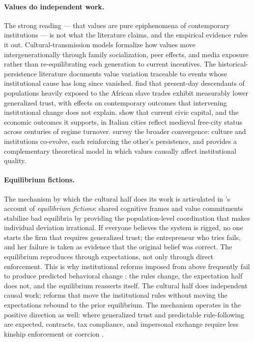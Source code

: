 \documentclass{article}
\theoremstyle{plain}
\theoremstyle{definition}
\theoremstyle{remark}
\begin{document}
\paragraph{Values do independent work.} The strong reading --- that values are pure epiphenomena of contemporary institutions --- is not what the literature claims, and the empirical evidence rules it out. Cultural-transmission models \citep{bisin2001economics} formalize how values move intergenerationally through family socialization, peer effects, and media exposure rather than re-equilibrating each generation to current incentives. The historical-persistence literature documents value variation traceable to events whose institutional cause has long since vanished. \citet{nunnwantchekon2011} find that present-day descendants of populations heavily exposed to the African slave trades exhibit measurably lower generalized trust, with effects on contemporary outcomes that intervening institutional change does not explain. \citet{guiso2016long} show that current civic capital, and the economic outcomes it supports, in Italian cities reflect medieval free-city status across centuries of regime turnover. \citet{alesina2015culture} survey the broader convergence: culture and institutions co-evolve, each reinforcing the other's persistence, and \citet{tabellini2008institutions} provides a complementary theoretical model in which values causally affect institutional quality.

\paragraph{Equilibrium fictions.} The mechanism by which the cultural half does its work is articulated in \citet{hoffstiglitz2010, hoffstiglitz2016striving}'s account of \emph{equilibrium fictions}: shared cognitive frames and value commitments stabilize bad equilibria by providing the population-level coordination that makes individual deviation irrational. If everyone believes the system is rigged, no one starts the firm that requires generalized trust; the entrepreneur who tries fails, and her failure is taken as evidence that the original belief was correct. The equilibrium reproduces through expectations, not only through direct enforcement. This is why institutional reforms imposed from above frequently fail to produce predicted behavioral change \citep{greif2006institutions}: the rules change, the expectation half does not, and the equilibrium reasserts itself. The cultural half does independent causal work; reforms that move the institutional rules without moving the expectations rebound to the prior equilibrium. The mechanism operates in the positive direction as well: where generalized trust and predictable rule-following are expected, contracts, tax compliance, and impersonal exchange require less kinship enforcement or coercion \citep{fukuyama1995trust, putnam2000bowling}.
\end{document}
